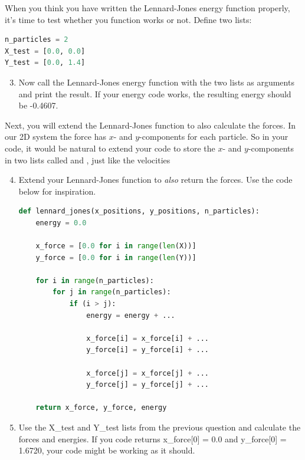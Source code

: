 \documentclass{article}
\begin{document}
When you think you have written the Lennard-Jones energy function properly,
it's time to test whether you function works or not.
Define two lists:

\begin{lstlisting}[language=python]
n_particles = 2
X_test = [0.0, 0.0]
Y_test = [0.0, 1.4]
\end{lstlisting}


\begin{enumerate}
    \setcounter{enumi}{2}

    \item Now call the Lennard-Jones energy function with the two lists as
        arguments and print the result. If your energy code works, the
        resulting energy should be -0.4607.

\end{enumerate}

Next, you will extend the Lennard-Jones function to also calculate
the forces. In our 2D system the force has $x$- and $y$-components for each
particle.
So in your code, it would be natural to extend your code to store the $x$- and
$y$-components in two lists called  and , just
like the velocities

\begin{enumerate}
    \setcounter{enumi}{3}

    \item Extend your Lennard-Jones function to \textit{also} return the forces.
        Use the code below for inspiration.

\begin{lstlisting}[language=python]
def lennard_jones(x_positions, y_positions, n_particles):
    energy = 0.0

    x_force = [0.0 for i in range(len(X))]
    y_force = [0.0 for i in range(len(Y))]

    for i in range(n_particles):
        for j in range(n_particles):
            if (i > j):
                energy = energy + ...

                x_force[i] = x_force[i] + ...
                y_force[i] = y_force[i] + ...

                x_force[j] = x_force[j] + ...
                y_force[j] = y_force[j] + ...

    return x_force, y_force, energy

\end{lstlisting}

    \item Use the X\_test and Y\_test lists from the previous question and
        calculate the forces and energies.
        If you code returns x\_force[0] = 0.0 and y\_force[0] = 1.6720, your
        code might be working as it should.

\end{enumerate}
\end{document}
